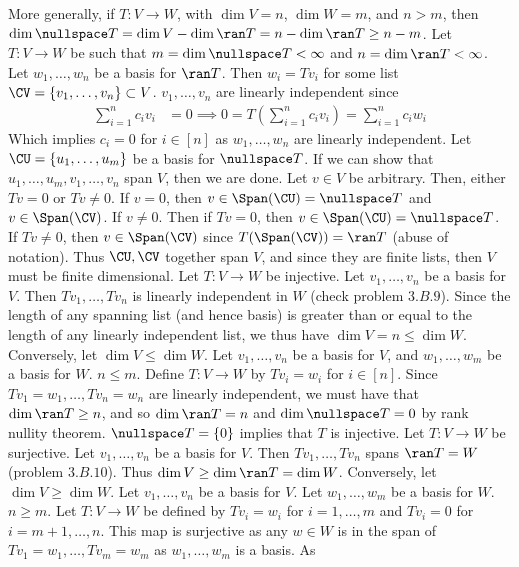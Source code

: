 \documentclass{book}
\begin{document}
\begin{enumerate}[label=\arabic*)]
      More generally, if $T: V \to W$, with $\dim V = n$, $\dim W = m$, and $n > m$, then $\dim\nullspace T = \dim V - \dim \ran T = n - \dim\ran T \geq n - m$.
    \ii
      Let $T: V \to W$ be such that $m = \dim\nullspace T < \infty$ and $n = \dim\ran T < \infty$. Let $w_1, \dots, w_n$ be a basis for $\ran T$. Then $w_i = Tv_i$ for some list $\CV = \{v_1, \dots,
      v_n\} \subset V$. $v_1, \dots, v_n$ are linearly independent since
      \begin{align*}
        \sum_{i = 1}^{n}c_iv_i & = 0 \implies 0 = T(\sum_{i = 1}^{n}c_iv_i) = \sum_{i = 1}^{n}c_iw_i
      \end{align*}
      Which implies $c_i = 0$ for $i \in [n]$ as $w_1, \dots, w_n$ are linearly independent. Let $\CU = \{u_1, \dots, u_m\}$ be a basis for $\nullspace T$. If we can show that $u_1, \dots,
      u_m, v_1, \dots, v_n$ span $V$, then we are done. Let $v \in V$ be arbitrary. Then, either $Tv = 0$ or $Tv \neq 0$. If $v = 0$, then $v \in \Span(\CU) = \nullspace T$ and $v \in
      \Span(\CV)$. If $v \neq 0$. Then if $Tv = 0$, then $v \in \Span(\CU) = \nullspace T$. If $Tv \neq 0$, then $v \in \Span(\CV)$ since $T(\Span(\CV)) = \ran T$ (abuse of notation). Thus
      $\CU, \CV$ together span $V$, and since they are finite lists, then $V$ must be finite dimensional. 
    \ii
      Let $T: V \to W$ be injective. Let $v_1, \dots, v_n$ be a basis for $V$. Then $Tv_1, \dots, Tv_n$ is linearly independent in $W$ (check problem $3.B.9$). Since the length of any
      spanning list (and hence basis) is greater than or equal to the length of any linearly independent list, we thus have $\dim V = n \leq \dim W$. Conversely, let $\dim V \leq \dim W$.
      Let $v_1, \dots, v_n$ be a basis for $V$, and $w_1, \dots, w_m$ be a basis for $W$. $n \leq m$. Define $T: V \to W$ by $Tv_i = w_i$ for $i \in [n]$. Since $Tv_1 = w_1, \dots, Tv_n =
      w_n$ are linearly independent, we must have that $\dim\ran T \geq n$, and so $\dim\ran T = n$ and $\dim\nullspace T = 0$ by rank nullity theorem. $\nullspace T = \{0\}$ implies that $T$ is
      injective.
    \ii
      Let $T: V \to W$ be surjective. Let $v_1, \dots, v_n$ be a basis for $V$. Then $Tv_1, \dots, Tv_n$ spans $\ran T = W$ (problem $3.B.10$). Thus $\dim V \geq \dim\ran T = \dim W$.
      Conversely, let $\dim V \geq \dim W$. Let $v_1, \dots, v_n$ be a basis for $V$. Let $w_1, \dots, w_m$ be a basis for $W$. $n \geq m$. Let $T: V \to W$ be defined by $Tv_i = w_i$ for $i
      = 1, \dots, m$ and $Tv_i = 0$ for $i = m + 1, \dots, n$. This map is surjective as any $w \in W$ is in the span of $Tv_1 = w_1, \dots, Tv_m = w_m$ as $w_1, \dots, w_m$ is a basis. As

\end{enumerate}
\end{document}
